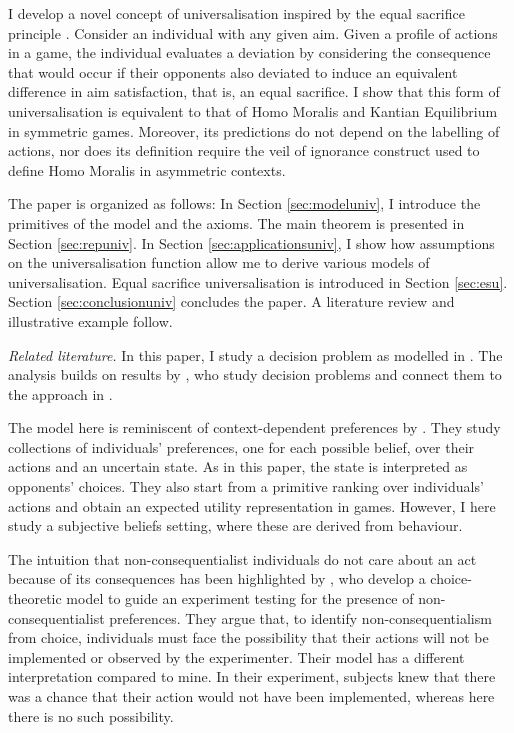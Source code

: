I develop a novel concept of universalisation inspired by the equal sacrifice principle \citep{millPrinciplesPoliticalEconomy1885,youngDistributiveJusticeTaxation1988}. Consider an individual with any given aim. Given a profile of actions in a game, the individual evaluates a deviation by considering the consequence that would occur if their opponents also deviated to induce an equivalent difference in aim satisfaction, that is, an equal sacrifice. I show that this form of universalisation is equivalent to that of Homo Moralis and Kantian Equilibrium in symmetric games. Moreover, its predictions do not depend on the labelling of actions, nor does its definition require the veil of ignorance construct used to define Homo Moralis in asymmetric contexts.

The paper is organized as follows: In Section \ref{sec:modeluniv}, I introduce the primitives of the model and the axioms. The main theorem is presented in Section \ref{sec:repuniv}. In Section \ref{sec:applicationsuniv}, I show how assumptions on the universalisation function allow me to derive various models of universalisation. Equal sacrifice universalisation is introduced in Section \ref{sec:esu}. Section \ref{sec:conclusionuniv} concludes the paper. A literature review and illustrative example follow.

\textit{Related literature.} In this paper, I study a decision problem as modelled in \cite{luceGamesDecisionsIntroduction1957}. The analysis builds on results by \cite{battigalliMixedExtensionsDecision2017}, who study \citeauthor{luceGamesDecisionsIntroduction1957} decision problems and connect them to the approach in \cite{anscombeDefinitionSubjectiveProbability1963}.

The model here is reminiscent of context-dependent preferences by \cite{gilboaDerivationExpectedUtility2003}. They study collections of individuals' preferences, one for each possible belief, over their actions and an uncertain state. As in this paper, the state is interpreted as opponents' choices. They also start from a primitive ranking over individuals' actions and obtain an expected utility representation in games. However, I here study a subjective beliefs setting, where these are derived from behaviour.

The intuition that non-consequentialist individuals do not care about an act because of its consequences has been highlighted by \cite{chenSocialPreferencesSacred2022}, who develop a choice-theoretic model to guide an experiment testing for the presence of non-consequentialist preferences. They argue that, to identify non-consequentialism from choice, individuals must face the possibility that their actions will not be implemented or observed by the experimenter. Their model has a different interpretation compared to mine. In their experiment, subjects knew that there was a chance that their action would not have been implemented, whereas here there is no such possibility.

